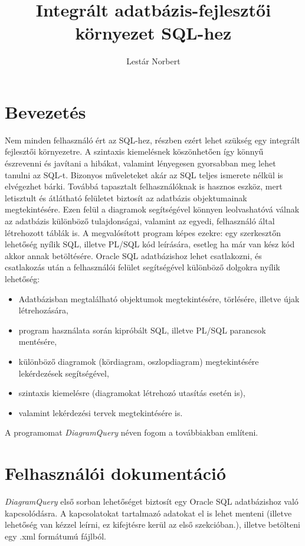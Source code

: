 \documentclass{elteikthesis}
\title{Integrált adatbázis-fejlesztői környezet SQL-hez}
\author{Lestár Norbert}
\begin{document}
\frontmatter

	\maketitle
	\tableofcontents
	
\mainmatter

\chapter{Bevezetés} 
Nem minden felhasználó ért az SQL-hez, részben ezért lehet szükség egy integrált fejlesztői
környezetre. A szintaxis kiemelésnek köszönhetően így könnyű észrevenni és javítani a hibákat,
valamint lényegesen gyorsabban meg lehet tanulni az SQL-t. Bizonyos műveleteket akár az SQL teljes
ismerete nélkül is elvégezhet bárki. Továbbá tapasztalt felhasználóknak is hasznos eszköz, mert
letisztult és átlátható felületet biztosít az adatbázis objektumainak megtekintésére. Ezen felül a
diagramok segítségével könnyen leolvashatóvá válnak az adatbázis különböző tulajdonságai, valamint
az egyedi, felhasználó által létrehozott táblák is.
A megvalósított program képes ezekre:
egy szerkesztőn lehetőség nyílik SQL, illetve PL/SQL kód leírására,
esetleg ha már van kész kód akkor annak betöltésére.
Oracle SQL adatbázishoz lehet csatlakozni, és
csatlakozás után a felhasználói felület segítségével különböző dolgokra nyílik lehetőség:
\begin{itemize}
  \item Adatbázisban megtalálható objektumok megtekintésére, törlésére, illetve újak létrehozására,
  \item program használata során kipróbált SQL, illetve PL/SQL parancsok mentésére,
  \item különböző diagramok (kördiagram, oszlopdiagram) megtekintésére lekérdezések segítségével,
  \item szintaxis kiemelésre (diagramokat létrehozó utasítás esetén is),
  \item valamint lekérdezési tervek megtekintésére is.
\end{itemize}
A programomat \textit{DiagramQuery} néven fogom a továbbiakban említeni.

\chapter{Felhasználói dokumentáció}
\textit{DiagramQuery} első sorban lehetőséget biztosít egy Oracle SQL adatbázishoz való kapcsolódásra.
A kapcsolatokat tartalmazó adatokat el is lehet menteni (illetve lehetőség van kézzel leírni,
ez kifejtésre kerül az első szekcióban.), illetve betölteni egy .xml formátumú fájlból.
\end{document}
